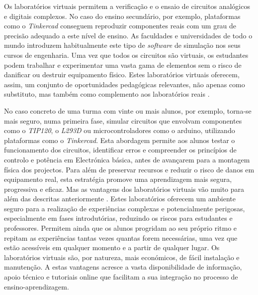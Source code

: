 Os laboratórios virtuais permitem a verificação e o ensaio de circuitos analógicos e digitais complexos. No caso do ensino secundário, por exemplo, plataformas como o \textit{Tinkercad} conseguem reproduzir componentes reais com um grau de precisão adequado a este nível de ensino. As faculdades e universidades de todo o mundo introduzem habitualmente este tipo de \textit{software} de simulação nos seus cursos de engenharia. Uma vez que todos os circuitos são virtuais, os estudantes podem trabalhar e experimentar uma vasta gama de elementos sem o risco de danificar ou destruir equipamento físico. Estes laboratórios virtuais oferecem, assim, um conjunto de oportunidades pedagógicas relevantes, não apenas como substituto, mas também como complemento aos laboratórios reais \cite{WebBrowserSimulators}. 

No caso concreto de uma turma com vinte ou mais alunos, por exemplo, torna-se mais seguro, numa primeira fase, simular circuitos que envolvam componentes como o \textit{TIP120}, o \textit{L293D} ou \acrshort{microcontroladores} como o \gls{arduino}, utilizando plataformas como o \textit{Tinkercad}. Esta abordagem permite aos alunos testar o funcionamento dos circuitos, identificar erros e compreender os princípios de controlo e potência em Electrónica básica, antes de avançarem para a montagem física dos projectos. Para além de preservar recursos e reduzir o risco de danos em equipamento real, esta estratégia promove uma aprendizagem mais segura, progressiva e eficaz. Mas as vantagens dos laboratórios virtuais vão muito para além das descritas anteriormente \cite{scheckler, lynch, BlogeMas95, vabtegensVL}. Estes laboratórios oferecem um ambiente seguro para a realização de experiências complexas e potencialmente perigosas, especialmente em fases introdutórias, reduzindo os riscos para estudantes e professores. Permitem ainda que os alunos progridam ao seu próprio ritmo e repitam as experiências tantas vezes quantas forem necessárias, uma vez que estão acessíveis em qualquer momento e a partir de qualquer lugar. Os laboratórios virtuais são, por natureza, mais económicos, de fácil instalação e manutenção. A estas vantagens acresce a vasta disponibilidade de informação, apoio técnico e tutoriais online que facilitam a sua integração no processo de ensino-aprendizagem.

